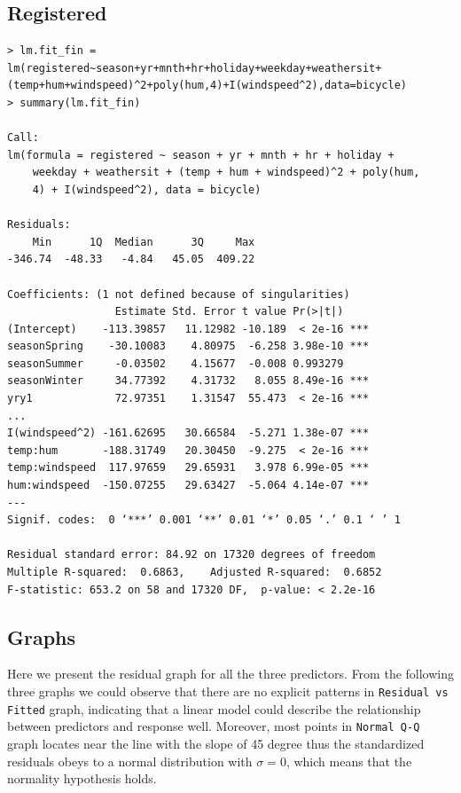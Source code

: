 \subsection{Registered}
\begin{lstlisting}[style=rlanguage]
> lm.fit_fin = lm(registered~season+yr+mnth+hr+holiday+weekday+weathersit+(temp+hum+windspeed)^2+poly(hum,4)+I(windspeed^2),data=bicycle)
> summary(lm.fit_fin)

Call:
lm(formula = registered ~ season + yr + mnth + hr + holiday +
    weekday + weathersit + (temp + hum + windspeed)^2 + poly(hum,
    4) + I(windspeed^2), data = bicycle)

Residuals:
    Min      1Q  Median      3Q     Max
-346.74  -48.33   -4.84   45.05  409.22

Coefficients: (1 not defined because of singularities)
                 Estimate Std. Error t value Pr(>|t|)
(Intercept)    -113.39857   11.12982 -10.189  < 2e-16 ***
seasonSpring    -30.10083    4.80975  -6.258 3.98e-10 ***
seasonSummer     -0.03502    4.15677  -0.008 0.993279
seasonWinter     34.77392    4.31732   8.055 8.49e-16 ***
yry1             72.97351    1.31547  55.473  < 2e-16 ***
...
I(windspeed^2) -161.62695   30.66584  -5.271 1.38e-07 ***
temp:hum       -188.31749   20.30450  -9.275  < 2e-16 ***
temp:windspeed  117.97659   29.65931   3.978 6.99e-05 ***
hum:windspeed  -150.07255   29.63427  -5.064 4.14e-07 ***
---
Signif. codes:  0 ‘***’ 0.001 ‘**’ 0.01 ‘*’ 0.05 ‘.’ 0.1 ‘ ’ 1

Residual standard error: 84.92 on 17320 degrees of freedom
Multiple R-squared:  0.6863,	Adjusted R-squared:  0.6852
F-statistic: 653.2 on 58 and 17320 DF,  p-value: < 2.2e-16
\end{lstlisting}

\subsection{Graphs}
Here we present the residual graph for all the three predictors. From the following three graphs we could observe that there are no explicit patterns in \texttt{Residual vs Fitted} graph, indicating that a linear model could describe the relationship between predictors and response well. Moreover, most points in \texttt{Normal Q-Q} graph locates near the line with the slope of 45 degree thus the standardized residuals obeys to a normal distribution with $\sigma = 0$, which means that the normality hypothesis holds.

